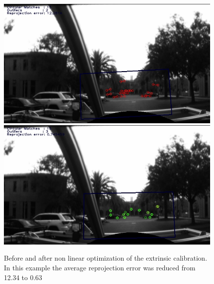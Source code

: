\begin{figure}[h!]
  \centering
    \includegraphics[width=1.0\textwidth]{chapters/images/verify_before_opt}
    \includegraphics[width=1.0\textwidth]{chapters/images/verify_after_opt}
  \caption{Before and after non linear optimization of the extrinsic calibration.  In this example the average reprojection error was reduced from 12.34 to 0.63}
  \label{fig:before_after_g2o}
\end{figure}